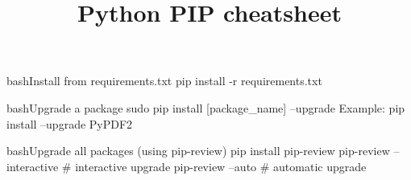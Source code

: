 \documentclass[10pt,a4paper]{article}
\title{\color{w3schools}Python PIP cheatsheet
}
\begin{document}
\maketitle
\small
\begin{multicols}{3}

\thispagestyle{empty}
\scriptsize

% 




\begin{codebox}{bash}{Install from requirements.txt}
pip install -r  requirements.txt

\end{codebox}

\begin{codebox}{bash}{Upgrade a package}
sudo pip install [package_name] --upgrade
Example: pip install --upgrade PyPDF2

\end{codebox}

\begin{codebox}{bash}{Upgrade all packages (using pip-review)}
pip install pip-review
pip-review --interactive # interactive upgrade
pip-review  --auto       # automatic upgrade

\end{codebox}


\AtNextBibliography{\footnotesize}
\printbibliography  
\end{multicols}
\end{document}
